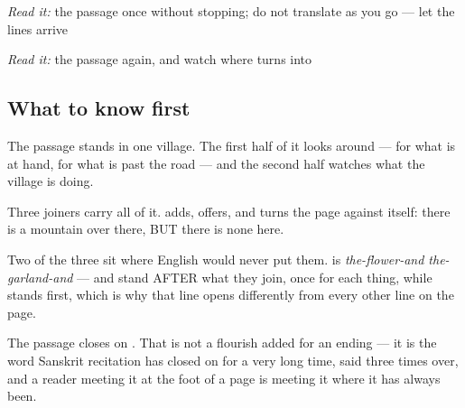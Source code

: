 \begin{tcolorbox}[breakable,skin=enhanced,colback=orange!6,colframe=orange!45!black,boxrule=0.5pt,arc=1mm,left=6pt,right=6pt,top=4pt,bottom=4pt,fonttitle=\bfseries,title={Read this}]
\begin{quote}
                                                  
\end{quote}

\emph{Read it:} the passage once without stopping; do not translate as you go — let the lines arrive

\emph{Read it:} the passage again, and watch where \textbf{} turns into \textbf{}
\end{tcolorbox}

\subsection*{What to know first}
The passage stands in one village. The first half of it looks around — \textbf{} for what is at hand, \textbf{} for what is past the road — and the second half watches what the village is doing.

Three joiners carry all of it. \textbf{} adds, \textbf{} offers, and \textbf{} turns the page against itself: there is a mountain over there, BUT there is none here.

Two of the three sit where English would never put them. \textbf{   } is \emph{the-flower-and the-garland-and} — \textbf{} and \textbf{} stand AFTER what they join, once for each thing, while \textbf{} stands first, which is why that line opens differently from every other line on the page.

The passage closes on \textbf{}. That is not a flourish added for an ending — it is the word Sanskrit recitation has closed on for a very long time, said three times over, and a reader meeting it at the foot of a page is meeting it where it has always been.

